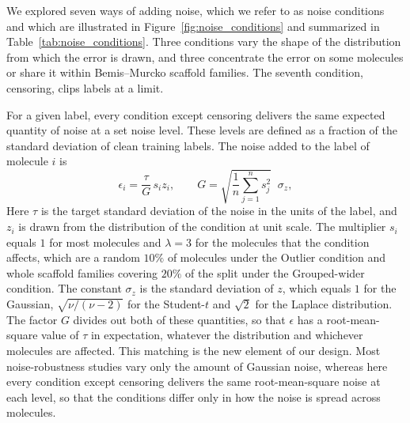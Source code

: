 We explored seven ways of adding noise, which we refer to as noise conditions and which are illustrated in Figure~\ref{fig:noise_conditions} and summarized in Table~\ref{tab:noise_conditions}. Three conditions vary the shape of the distribution from which the error is drawn, and three concentrate the error on some molecules or share it within Bemis--Murcko scaffold families. The seventh condition, censoring, clips labels at a limit.

For a given label, every condition except censoring delivers the same expected quantity of noise at a set noise level. These levels are defined as a fraction of the standard deviation of clean training labels. The noise added to the label of molecule $i$ is
\begin{equation}
\epsilon_i = \frac{\tau}{G}\,s_i z_i,
\qquad
G = \sqrt{\frac{1}{n}\sum_{j=1}^{n} s_j^{2}}\;\;\sigma_z,
\label{eq:dose_matching}
\end{equation}
Here $\tau$ is the target standard deviation of the noise in the units of the label, and $z_i$ is
drawn from the distribution of the condition at unit scale. The multiplier $s_i$ equals $1$ for most
molecules and $\lambda = 3$ for the molecules that the condition affects, which are a random $10\%$ of molecules
under the Outlier condition and whole scaffold families covering $20\%$ of the split under the Grouped-wider condition. The
constant $\sigma_z$ is the standard deviation of $z$, which equals $1$ for the Gaussian,
$\sqrt{\nu/(\nu-2)}$ for the Student-$t$ and $\sqrt{2}$ for the Laplace distribution. The factor $G$ divides out both
of these quantities, so that $\epsilon$ has a root-mean-square value of $\tau$ in expectation, whatever the
distribution and whichever molecules are affected. This matching is the new element of our design. Most noise-robustness studies vary only the amount of Gaussian noise, whereas here every condition except censoring delivers the same root-mean-square noise at each level, so that the conditions differ only in how the noise is spread across molecules. %

